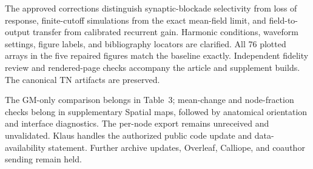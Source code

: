 \documentclass[11pt,a4paper,landscape]{article}
\begin{document}
The approved corrections distinguish synaptic-blockade selectivity from loss
of response, finite-cutoff simulations from the exact mean-field limit, and
field-to-output transfer from calibrated recurrent gain. Harmonic conditions,
waveform settings, figure labels, and bibliography locators are clarified.
All 76 plotted arrays in the five repaired figures match the baseline
exactly. Independent fidelity review and rendered-page checks accompany
the article and supplement builds. The canonical TN artifacts are preserved.

The GM-only comparison belongs in Table~3; mean-change and node-fraction checks
belong in supplementary Spatial maps, followed by anatomical orientation and
interface diagnostics. The per-node export remains unreceived and unvalidated.
Klaus handles the authorized public code update and data-availability statement.
Further archive updates, Overleaf, Calliope, and coauthor sending remain held.
\end{document}
